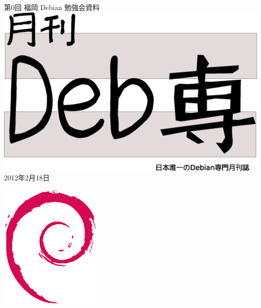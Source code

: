 \documentclass[mingoth,a4paper]{jsarticle}
\newcommand{\debmtgyear}{2012}
\newcommand{\debmtgmonth}{2}
\newcommand{\debmtgdate}{18}
\newcommand{\debmtgnumber}{0}
\begin{document}
\begin{titlepage}
\thispagestyle{empty}

\vspace*{-2cm}
第\debmtgnumber{}回 福岡 Debian 勉強会資料\\
\hspace*{-2cm}
\includegraphics[width=210mm]{image201003/debsen.eps}\\
\hfill{}\debmtgyear{}年\debmtgmonth{}月\debmtgdate{}日



\vspace*{-2cm}
\hfill{}\includegraphics[height=6cm]{image200502/openlogo-nd.eps}
\end{titlepage}

\end{document}
